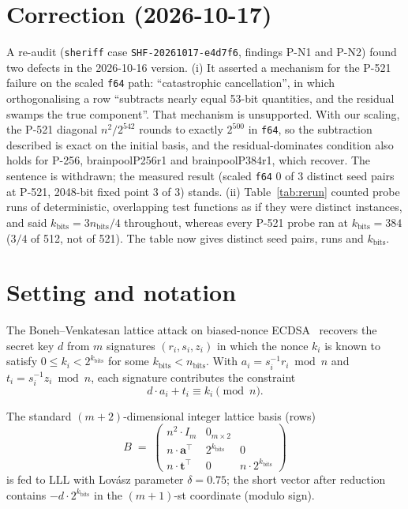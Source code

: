 \documentclass[10pt,a4paper]{article}
\begin{document}
\section*{Correction (2026-10-17)}

A re-audit (\texttt{sheriff} case \texttt{SHF-20261017-e4d7f6},
findings P-N1 and P-N2) found two defects in the 2026-10-16 version.
(i) It asserted a mechanism for the P-521 failure on the scaled
\texttt{f64} path: ``catastrophic cancellation'', in which
orthogonalising a row ``subtracts nearly equal 53-bit quantities, and
the residual swamps the true component''. That mechanism is
unsupported. With our scaling, the P-521 diagonal $n^2/2^{542}$ rounds
to exactly $2^{500}$ in \texttt{f64}, so the subtraction described is
exact on the initial basis, and the residual-dominates condition also
holds for P-256, brainpoolP256r1 and brainpoolP384r1, which recover.
The sentence is withdrawn; the measured result (scaled \texttt{f64}
0 of 3 distinct seed pairs at P-521, 2048-bit fixed point 3 of 3)
stands. (ii) Table~\ref{tab:rerun} counted probe runs of deterministic,
overlapping test functions as if they were distinct instances, and
said $k_{\text{bits}} = 3n_{\text{bits}}/4$ throughout, whereas every
P-521 probe ran at $k_{\text{bits}} = 384$ ($3/4$ of 512, not of 521).
The table now gives distinct seed pairs, runs and $k_{\text{bits}}$.

\section{Setting and notation}

The Boneh--Venkatesan lattice attack on biased-nonce
ECDSA~\cite{boneh1996,nguyen2002} recovers the secret key $d$ from
$m$ signatures $(r_i, s_i, z_i)$ in which the nonce $k_i$ is known
to satisfy $0 \leq k_i < 2^{k_{\text{bits}}}$ for some
$k_{\text{bits}} < n_{\text{bits}}$. With $a_i = s_i^{-1} r_i \bmod n$
and $t_i = s_i^{-1} z_i \bmod n$, each signature contributes the
constraint
\[
   d \cdot a_i + t_i \equiv k_i \pmod{n}.
\]

The standard $(m+2)$-dimensional integer lattice basis (rows)
\[
   B \;=\;
   \begin{pmatrix}
     n^2 \cdot I_m   & 0_{m \times 2}  \\[2pt]
     n \cdot \mathbf{a}^\top  & 2^{k_{\text{bits}}}  & 0 \\[2pt]
     n \cdot \mathbf{t}^\top  & 0  & n \cdot 2^{k_{\text{bits}}}
   \end{pmatrix}
\]
is fed to LLL with Lov\'asz parameter $\delta = 0.75$; the short
vector after reduction contains $-d \cdot 2^{k_{\text{bits}}}$ in
the $(m+1)$-st coordinate (modulo sign).
\end{document}
